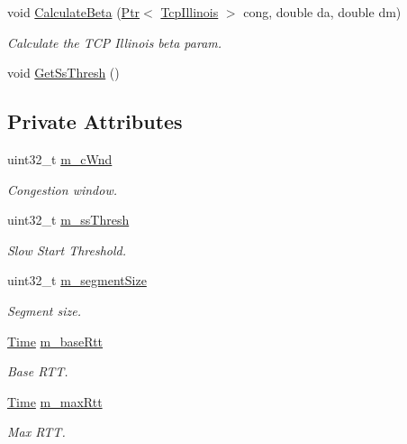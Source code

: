 \begin{DoxyCompactItemize}
void \hyperlink{classTcpIllinoisTest_aa20729ec761d54b2faba82f0db597d89}{Calculate\+Beta} (\hyperlink{classns3_1_1Ptr}{Ptr}$<$ \hyperlink{classns3_1_1TcpIllinois}{Tcp\+Illinois} $>$ cong, double da, double dm)
\begin{DoxyCompactList}\small\item\em Calculate the T\+CP Illinois beta param. \end{DoxyCompactList}\item 
void \hyperlink{classTcpIllinoisTest_ac449445631e52afb00713e0728d5eddb}{Get\+Ss\+Thresh} ()
\end{DoxyCompactItemize}
\subsection*{Private Attributes}
\begin{DoxyCompactItemize}
\item 
uint32\+\_\+t \hyperlink{classTcpIllinoisTest_aa043b73084f6df13d4f66e3883f17f04}{m\+\_\+c\+Wnd}
\begin{DoxyCompactList}\small\item\em Congestion window. \end{DoxyCompactList}\item 
uint32\+\_\+t \hyperlink{classTcpIllinoisTest_ad317e78be889562aaafe3ba3e48a172f}{m\+\_\+ss\+Thresh}
\begin{DoxyCompactList}\small\item\em Slow Start Threshold. \end{DoxyCompactList}\item 
uint32\+\_\+t \hyperlink{classTcpIllinoisTest_adfa1e99117e019db39ec76bf9026e8c7}{m\+\_\+segment\+Size}
\begin{DoxyCompactList}\small\item\em Segment size. \end{DoxyCompactList}\item 
\hyperlink{classns3_1_1Time}{Time} \hyperlink{classTcpIllinoisTest_a4546c5096f2a83762e18900674060716}{m\+\_\+base\+Rtt}
\begin{DoxyCompactList}\small\item\em Base R\+TT. \end{DoxyCompactList}\item 
\hyperlink{classns3_1_1Time}{Time} \hyperlink{classTcpIllinoisTest_a4c60297baed9b939d21297582b71ab85}{m\+\_\+max\+Rtt}
\begin{DoxyCompactList}\small\item\em Max R\+TT. \end{DoxyCompactList}\item 

\end{DoxyCompactItemize}
